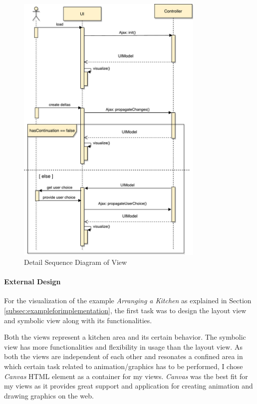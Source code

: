\begin{figure}
	\includegraphics[width=0.8\textwidth]{figures/Sequence_Diagram-View}
	\caption{Detail Sequence Diagram of View}
	\label{fig:Sequence_Diagram-View}
\end{figure}

\paragraph{External Design}
For the visualization of the example \textit{Arranging a Kitchen} as explained in Section \ref{subsec:exampleforimplementation}, the first task was to design the layout view and symbolic view along with its functionalities.

Both the views represent a kitchen area and its certain behavior. The symbolic view has more functionalities and flexibility in usage than the layout view. As both the views are independent of each other and resonates a confined area in which certain task related to animation/graphics has to be performed, I chose \textit{Canvas} \cite{canvas} HTML element as a container for my views. \textit{Canvas} was the best fit for my views as it provides great support and application for creating animation and drawing graphics on the web.

